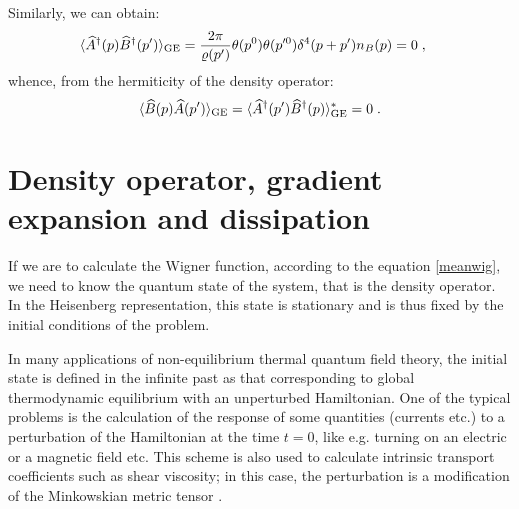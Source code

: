 \documentclass[prd,superscriptaddress,nofootinbib,notitlepage]{revtex4-1}
\def\wA{{\widehat A}}
\def\wB{{\widehat B}}
\def\wA{\widehat A}
\def\wAd{\widehat A^{\dagger}}
\def\wB{\widehat B}
\def\wBd{\widehat B^{\dagger}}
\newcommand{\be}{\begin{equation}}
\newcommand{\ee}{\end{equation}}
\begin{document}
Similarly, we can obtain:
%
\begin{align} \label{tevab}
\langle \wAd(p)\wBd(p')\rangle_{\rm GE} &= \frac{2\pi}{\varrho(p')} \theta(p^0)\theta(p'^0) 
\delta^4(p+p') n_B(p) = 0 \;,
\end{align}
%
whence, from the hermiticity of the density operator:
%
\be\label{tevba}
\langle \wB(p)\wA(p')\rangle_{\rm GE} = \langle \wAd(p')\wBd(p)\rangle_{\rm GE}^*= 0\;.
\ee
%


\section{Density operator, gradient expansion and dissipation}
\label{density}

If we are to calculate the Wigner function, according to the equation \eqref{meanwig}, we need to know the quantum state of the 
system, that is the density operator. In the Heisenberg representation, this state is stationary and is thus fixed by the initial
conditions of the problem. 

In many applications of non-equilibrium thermal quantum field theory, the initial state is defined in the infinite past as 
that corresponding to global thermodynamic equilibrium with an unperturbed Hamiltonian. 
One of the typical problems is the calculation of the response of some quantities (currents etc.) to a perturbation of the 
Hamiltonian at the time $t=0$, like e.g. turning on an electric or a magnetic field etc. This scheme is also used to calculate 
intrinsic transport coefficients such as shear viscosity; in this case, the perturbation is a modification of the Minkowskian 
metric tensor \cite{Jeon:1994if}. 
\end{document}
